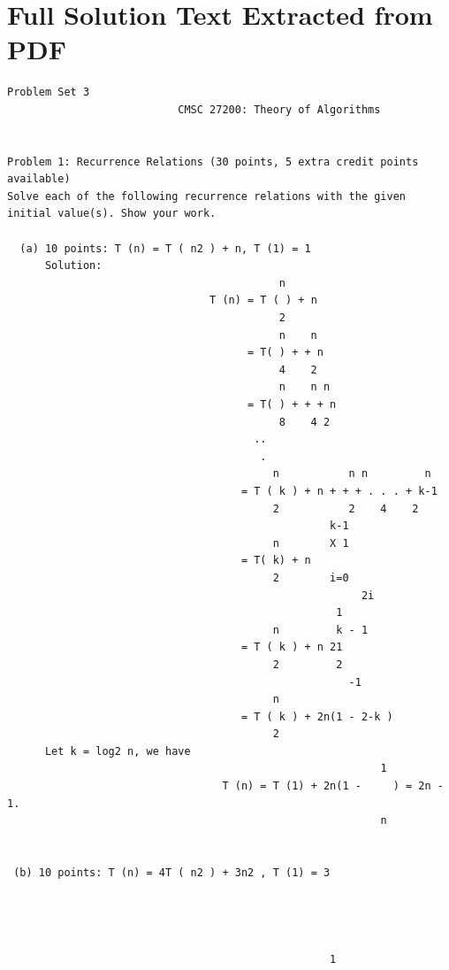 \documentclass[12pt]{article}
\begin{document}
\section*{Full Solution Text Extracted from PDF}
\begin{Verbatim}[breaklines=true,fontsize=\small]
                                      Problem Set 3
                           CMSC 27200: Theory of Algorithms


Problem 1: Recurrence Relations (30 points, 5 extra credit points
available)
Solve each of the following recurrence relations with the given initial value(s). Show your work.

  (a) 10 points: T (n) = T ( n2 ) + n, T (1) = 1
      Solution:
                                           n
                                T (n) = T ( ) + n
                                           2
                                           n    n
                                      = T( ) + + n
                                           4    2
                                           n    n n
                                      = T( ) + + + n
                                           8    4 2
                                       ..
                                        .
                                          n           n n         n
                                     = T ( k ) + n + + + . . . + k-1
                                          2           2    4    2
                                                   k-1
                                          n        X 1
                                     = T( k) + n
                                          2        i=0
                                                        2i
                                                    1
                                          n         k - 1
                                     = T ( k ) + n 21
                                          2         2
                                                      -1
                                          n
                                     = T ( k ) + 2n(1 - 2-k )
                                          2
      Let k = log2 n, we have
                                                           1
                                  T (n) = T (1) + 2n(1 -     ) = 2n - 1.
                                                           n


 (b) 10 points: T (n) = 4T ( n2 ) + 3n2 , T (1) = 3




                                                   1


\end{Verbatim}
\end{document}
